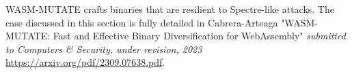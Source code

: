 





\begin{tcolorbox}[title=Contribution paper,boxrule=1pt,arc=.2em,boxsep=1.0mm]
    WASM-MUTATE crafts \Wasm binaries that are resilient to Spectre-like attacks. 
    The case discussed in this section is fully detailed in Cabrera-Arteaga \etal "WASM-MUTATE: Fast and Effective Binary Diversification for WebAssembly"
    \emph{submitted to Computers \& Security, under revision, 2023}
    \url{https://arxiv.org/pdf/2309.07638.pdf}. 
\end{tcolorbox}



